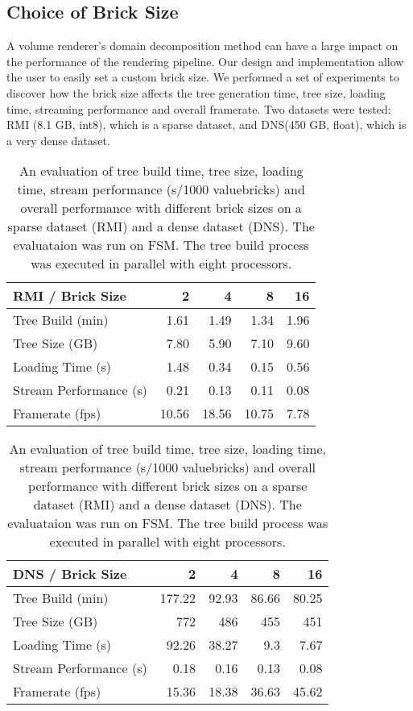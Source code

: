 \subsection{Choice of Brick Size}
\label{sec:exp_bricksize}

A volume renderer's domain decomposition method can have a large impact on the 
performance of the rendering pipeline\cite{fogal2013analysis}. Our design and 
implementation allow the user to easily set a custom brick size. 
We performed a set of experiments to discover how the brick size affects the
tree generation time, tree size, loading time, streaming performance and overall
framerate. Two datasets were tested: RMI (8.1 GB, int8), which is a sparse dataset, and
DNS(450 GB, float), which is a very dense dataset.

\begin{table}[h!]
	\centering
	\begin{tabularx}{\linewidth}{l*{4}{r}}
		\toprule  
		\textbf{RMI / Brick Size}   & \textbf{2} & \textbf{4} & \textbf{8} & \textbf{16}  \\
		\hline
		Tree Build (min) & 1.61 & 1.49 & 1.34 & 1.96  \\
        Tree Size (GB) & 7.80 & 5.90 & 7.10 & 9.60  \\
        Loading Time (s) & 1.48 & 0.34 & 0.15 & 0.56  \\
        Stream Performance (s) & 0.21 & 0.13 & 0.11 & 0.08  \\
        Framerate (fps) & 10.56 & 18.56 & 10.75 & 7.78  \\
		\bottomrule
	\end{tabularx}
    \begin{tabularx}{\linewidth}{l*{4}{r}}
		\toprule  
		\textbf{DNS / Brick Size}   & \textbf{2} & \textbf{4} & \textbf{8} & \textbf{16}  \\
		\hline
		Tree Build (min) & 177.22 & 92.93 & 86.66 & 80.25  \\
        Tree Size (GB) & 772 & 486 & 455 & 451  \\
        Loading Time (s) & 92.26 & 38.27 & 9.3 & 7.67  \\
        Stream Performance (s) & 0.18 & 0.16 & 0.13 & 0.08  \\
        Framerate (fps) & 15.36 & 18.38 & 36.63 & 45.62  \\
		\bottomrule
	\end{tabularx}
	\caption{An evaluation of tree build time, tree size, loading time, stream performance (s/1000 valuebricks) and overall performance with different brick sizes on a sparse dataset (RMI) and a dense dataset (DNS). The evaluataion was run on FSM. The tree build process was executed in parallel with eight processors.}
	\label{table:brick_size}
\end{table}

